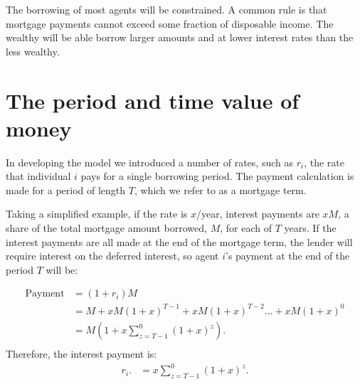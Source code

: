 The borrowing of most agents will be constrained. A common rule is that mortgage payments cannot exceed some fraction of disposable income. The wealthy will be able borrow larger amounts and at lower interest rates than the less wealthy. 



\section{The period and time value of money}
In developing the model we introduced a number of rates, such as $r_i$, the rate that individual $i$ pays for a single borrowing period. The payment calculation is made for a period of length $T$, which we refer to as a mortgage term.

Taking a simplified example, if the rate is $x$/year, interest payments are $xM$, a share of the total mortgage amount borrowed, $M$, for each of $T$ years. 
If the interest payments are all made at the end of the mortgage term, the lender will require interest on the deferred interest, so agent $i$'s payment at the end of the period $T$ will be:

\begin{align*}
\text{Payment} &= (1+r_i)M                                 \\ 
    &= M + xM(1+x)^{T-1}+ xM(1+x)^{T-2}\dots + xM(1+x)^{0} \\
    &= M\left(1+ x\sum_{z=T-1}^0(1+x)^{z}\right).          \\ 
\end{align*}
Therefore, the interest payment is:
\begin{align*}
r_i.   &=x\sum_{z=T-1}^0(1+x)^{z}.
\end{align*}


